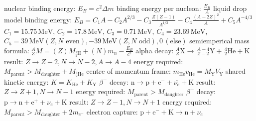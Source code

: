 \documentclass[10pt,landscape]{article}
\newcommand{\spc}{\hspace*{1em}}
\begin{document}
\begin{multicols*}{3}
\spc nuclear binding energy: $E_B=c^2\Delta m$
\newline
\spc binding energy per nucleon: $\frac{E_B}{A}$
\newline \newline
liquid drop model
\newline
\spc binding energy: $E_B=C_1A-C_2A^{2/3}-C_3\frac{Z(Z-1)}{A^{1/3}}-C_4\frac{(A-2Z)^2}{A}+C_5A^{-4/3}$
\newline
\spc\spc $C_1=15.75\,\textrm{MeV}$, $C_2=17.8\,\textrm{MeV}$,
\newline
\spc\spc $C_3=0.71\,\textrm{MeV}$, $C_4=23.69\,\textrm{MeV}$,
\newline
\spc\spc $C_5=39\,\textrm{MeV}(Z,N\textrm{ even}),-39\,\textrm{MeV}(Z,N\textrm{ odd}),0\,(\textrm{else})$
\newline
\spc semiemperical mass formula: $^A_ZM=(Z)M_{^1_1\textrm{H}}+(N)m_n-\frac{E_B}{c^2}$
\newline \newline
alpha decay: $^A_Z\textrm{X}\rightarrow \,^{A-4}_{Z-2}\textrm{Y}+\,^4_2\textrm{He}+\textrm{K}$
\newline
\spc result: $Z\rightarrow Z-2, N\rightarrow N-2, A\rightarrow A-4$
\newline
\spc energy required: $M_\textrm{parent}>M_{\textrm{daughter}}+M_{^4_2\textrm{He}}$
\newline
\spc centre of momentum frame: $m_{\textrm{He}}v_{\textrm{He}}=M_{\textrm{Y}}V_{\textrm{Y}}$
\newline
\spc shared kinetic energy: $K=K_{\textrm{He}}+K_{\textrm{Y}}$
\newline \newline
$\beta^-$ decay: $\textrm{n}\rightarrow \textrm{p}+\textrm{e}^-+\overline{\nu_e}+\textrm{K}$
\newline
\spc result: $Z\rightarrow Z+1, N\rightarrow N-1$
\newline
\spc energy required:
$M_\textrm{parent}>M_{\textrm{daughter}}$
\newline \newline
$\beta^+$ decay: $\textrm{p}\rightarrow \textrm{n}+\textrm{e}^++\nu_e+\textrm{K}$
\newline
\spc result: $Z\rightarrow Z-1, N\rightarrow N+1$
\newline
\spc energy required:
$M_\textrm{parent}>M_{\textrm{daughter}}+2m_{e^-}$
\newline \newline
electron capture: $\textrm{p}+\textrm{e}^-+\textrm{K}\rightarrow \textrm{n}+\nu_e$

\end{multicols*}
\end{document}
